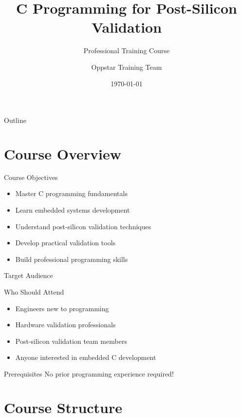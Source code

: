 \documentclass[aspectratio=169]{beamer}
\title{C Programming for Post-Silicon Validation}
\subtitle{Professional Training Course}
\author{Oppstar Training Team}
\institute{Oppstar Corporation}
\date{\today}
\begin{document}
\oppstartitlepage

\begin{frame}{Outline}
  \tableofcontents
\end{frame}

\section{Course Overview}

\begin{frame}{Course Objectives}
  \begin{itemize}
    \item Master C programming fundamentals
    \item Learn embedded systems development
    \item Understand post-silicon validation techniques
    \item Develop practical validation tools
    \item Build professional programming skills
  \end{itemize}
\end{frame}

\begin{frame}{Target Audience}
  \begin{block}{Who Should Attend}
    \begin{itemize}
      \item Engineers new to programming
      \item Hardware validation professionals
      \item Post-silicon validation team members
      \item Anyone interested in embedded C development
    \end{itemize}
  \end{block}

  \begin{alertblock}{Prerequisites}
    No prior programming experience required!
  \end{alertblock}
\end{frame}

\section{Course Structure}
\end{document}
